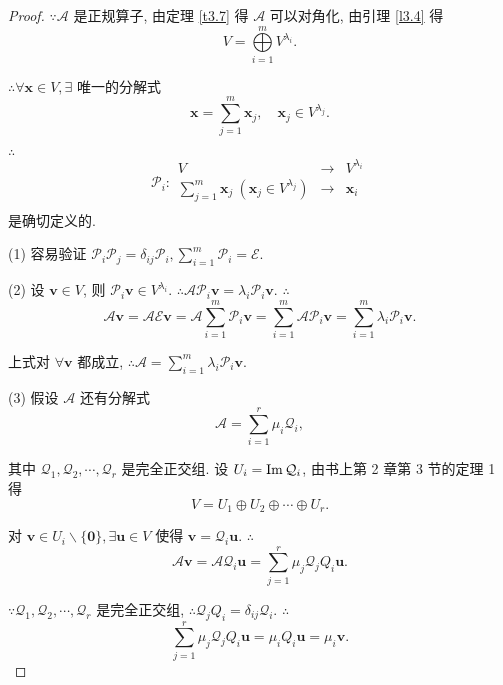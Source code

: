 \documentclass[color=black,device=normal,lang=cn,mode=geye]{elegantnote}
\begin{document}
\begin{proof}
    $\because\mathcal{A}$ 是正规算子, 由定理 \ref{t3.7} 得 $\mathcal{A}$ 可以对角化, 由引理 \ref{l3.4} 得
    \[V=\bigoplus\limits_{i=1}^mV^{\lambda_i}.\]

    $\therefore\forall\boldsymbol{x}\in V,\exists$ 唯一的分解式
    \[\boldsymbol{x}=\sum\limits_{j=1}^m\boldsymbol{x}_j,\quad\boldsymbol{x}_j\in V^{\lambda_j}.\]

    $\therefore$
    \[\mathcal{P}_i:\begin{array}{rcl}
        V & \to & V^{\lambda_i} \\
        \sum\limits_{j=1}^m\boldsymbol{x}_j\ (\boldsymbol{x}_j\in V^{\lambda_j}) & \to & \boldsymbol{x}_i \\
    \end{array}\]
    是确切定义的.

    (1) 容易验证 $\mathcal{P}_i\mathcal{P}_j=\delta_{ij}\mathcal{P}_i,\sum\limits_{i=1}^m\mathcal{P}_i=\mathcal{E}$.

    (2) 设 $\boldsymbol{v}\in V$, 则 $\mathcal{P}_i\boldsymbol{v}\in V^{\lambda_i}$. $\therefore\mathcal{A}\mathcal{P}_i\boldsymbol{v}=\lambda_i\mathcal{P}_i\boldsymbol{v}$. $\therefore$
    \[\mathcal{A}\boldsymbol{v}=\mathcal{AE}\boldsymbol{v}=\mathcal{A}\sum\limits_{i=1}^m\mathcal{P}_i\boldsymbol{v}=\sum\limits_{i=1}^m\mathcal{A}\mathcal{P}_i\boldsymbol{v}=\sum\limits_{i=1}^m\lambda_i\mathcal{P}_i\boldsymbol{v}.\]

    上式对 $\forall\boldsymbol{v}$ 都成立, $\therefore\mathcal{A}=\sum\limits_{i=1}^m\lambda_i\mathcal{P}_i\boldsymbol{v}$.

    (3) 假设 $\mathcal{A}$ 还有分解式
    \[\mathcal{A}=\sum\limits_{i=1}^r\mu_i\mathcal{Q}_i,\]

    其中 $\mathcal{Q}_1,\mathcal{Q}_2,\cdots,\mathcal{Q}_r$ 是完全正交组. 设 $U_i=\operatorname{Im} \mathcal{Q}_i$, 由书上第 2 章第 3 节的定理 1 得
    \begin{equation}\label{eq3.5}
        V=U_1\oplus U_2\oplus\cdots\oplus U_r.
    \end{equation}

    对 $\boldsymbol{v}\in U_i\backslash\{\boldsymbol{0}\},\exists\boldsymbol{u}\in V$ 使得 $\boldsymbol{v}=\mathcal{Q}_i\boldsymbol{u}$. $\therefore$
    \[\mathcal{A}\boldsymbol{v}=\mathcal{AQ}_i\boldsymbol{u}=\sum\limits_{j=1}^r\mu_j\mathcal{Q}_j{Q}_i\boldsymbol{u}.\]

    $\because\mathcal{Q}_1,\mathcal{Q}_2,\cdots,\mathcal{Q}_r$ 是完全正交组, $\therefore\mathcal{Q}_j{Q}_i=\delta_{ij}\mathcal{Q}_i$. $\therefore$
    \[\sum\limits_{j=1}^r\mu_j\mathcal{Q}_j{Q}_i\boldsymbol{u}=\mu_i{Q}_i\boldsymbol{u}=\mu_i\boldsymbol{v}.\]


\end{proof}
\end{document}
